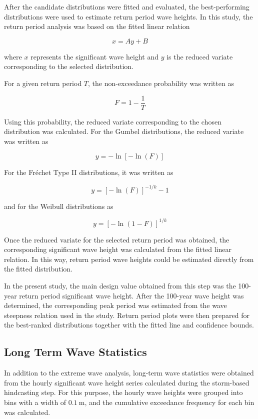 \documentclass[a4paper, 11pt]{article}
\begin{document}
After the candidate distributions were fitted and evaluated, the best-performing distributions were used to estimate return period wave heights. In this study, the return period analysis was based on the fitted linear relation

\[
x = Ay + B
\]

where \(x\) represents the significant wave height and \(y\) is the reduced variate corresponding to the selected distribution.

For a given return period \(T\), the non-exceedance probability was written as

\[
F = 1-\frac{1}{T}
\]

Using this probability, the reduced variate corresponding to the chosen distribution was calculated. For the Gumbel distributions, the reduced variate was written as

\[
y = -\ln\left[-\ln(F)\right]
\]

For the Fr\'echet Type II distributions, it was written as

\[
y = \left[-\ln(F)\right]^{-1/k}-1
\]

and for the Weibull distributions as

\[
y = \left[-\ln(1-F)\right]^{1/k}
\]

Once the reduced variate for the selected return period was obtained, the corresponding significant wave height was calculated from the fitted linear relation. In this way, return period wave heights could be estimated directly from the fitted distribution.

In the present study, the main design value obtained from this step was the 100-year return period significant wave height. After the 100-year wave height was determined, the corresponding peak period was estimated from the wave steepness relation used in the study. Return period plots were then prepared for the best-ranked distributions together with the fitted line and confidence bounds.


\subsection{Long Term Wave Statistics}
\hspace*{0.5cm}In addition to the extreme wave analysis, long-term wave statistics were obtained from the hourly significant wave height series calculated during the storm-based hindcasting step. For this purpose, the hourly wave heights were grouped into bins with a width of \(0.1\ \mathrm{m}\), and the cumulative exceedance frequency for each bin was calculated.
\end{document}
